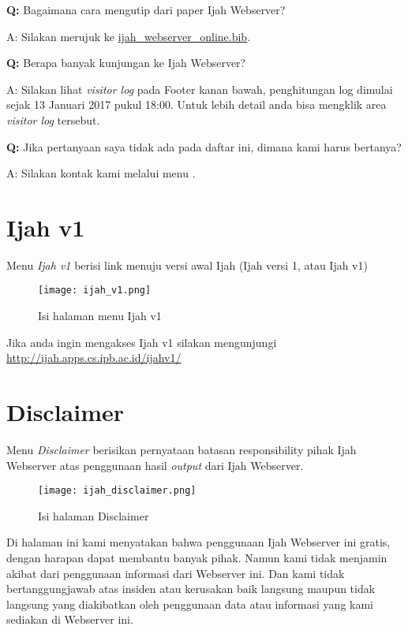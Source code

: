 \textbf{Q:} Bagaimana cara mengutip dari paper Ijah Webserver?

A: Silakan merujuk ke \href{http://ijah.apps.cs.ipb.ac.id/api/ijah_webserver_online.bib}{ijah\_webserver\_online.bib}.

\textbf{Q:} Berapa banyak kunjungan ke Ijah Webserver?

A: Silakan lihat \emph{visitor log} pada Footer kanan bawah, penghitungan log dimulai sejak 13 Januari 2017 pukul 18:00. Untuk lebih detail anda bisa mengklik area \emph{visitor log} tersebut.

\textbf{Q:} Jika pertanyaan saya tidak ada pada daftar ini, dimana kami harus bertanya?

A: Silakan kontak kami melalui menu .

\section{Ijah v1}

Menu \emph{Ijah v1} berisi link menuju versi awal Ijah (Ijah versi 1, atau Ijah v1)

\begin{figure}[H]
	\centering
	\texttt{[image: ijah\_v1.png]}
	\caption{Isi halaman menu Ijah v1}
	\label{fig:ijah_v1}
\end{figure}

Jika anda ingin mengakses Ijah v1 silakan mengunjungi \url{http://ijah.apps.cs.ipb.ac.id/ijahv1/}

\section{Disclaimer}

Menu \emph{Disclaimer} berisikan pernyataan batasan responsibility pihak Ijah Webserver atas penggunaan hasil \emph{output} dari Ijah Webserver.

\begin{figure}[H]
	\centering
	\texttt{[image: ijah\_disclaimer.png]}
	\caption{Isi halaman Disclaimer}
	\label{fig:ijah_disclaimer}
\end{figure}

Di halaman ini kami menyatakan bahwa penggunaan Ijah Webserver ini gratis, dengan harapan dapat membantu banyak pihak. Namun kami tidak menjamin akibat dari penggunaan informasi dari Webserver ini. Dan kami tidak bertanggungjawab atas insiden atau kerusakan baik langsung maupun tidak langsung yang diakibatkan oleh penggunaan data atau informasi yang kami sediakan di Webserver ini.

